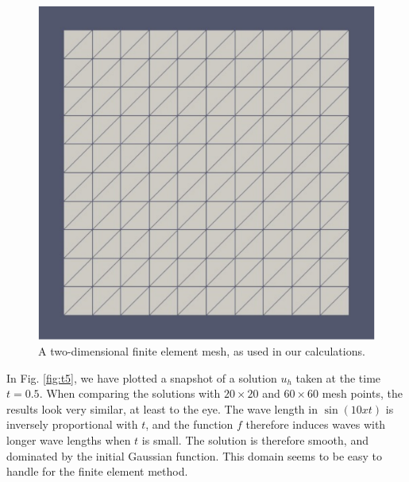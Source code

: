 \documentclass[twoside]{article}
\begin{document}
\begin{figure} 
  \centering
  \includegraphics[scale=0.2]{figures/mesh/mesh3-crop.pdf}
  \caption{A two-dimensional finite element mesh, as used in our calculations.}\label{fig:mesh}
\end{figure}

In Fig. \ref{fig:t5}, we have plotted a snapshot of a solution $u_{h}$ taken at the time $t = 0.5$. When comparing the solutions with $20 \times 20$ and $60 \times 60$ mesh points, the results look very similar, at least to the eye. The wave length in $\sin(10xt)$ is inversely proportional with $t$, and the function $f$ therefore induces waves with longer wave lengths when $t$ is small. The solution is therefore smooth, and dominated by the initial Gaussian function. This domain seems to be easy to handle for the finite element method.
\end{document}
